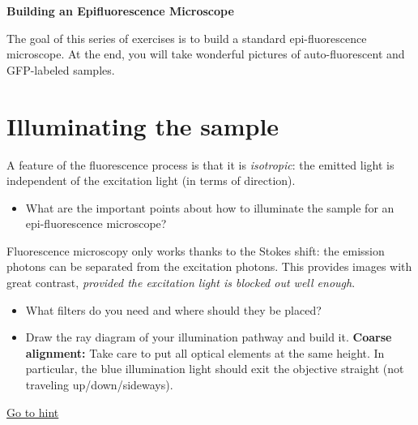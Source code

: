 \documentclass[a4paper]{report}
\begin{document}
\setcounter{secnumdepth}{2}
\begin{center}
	\textbf{\Large{Building an Epifluorescence Microscope}}
\end{center}

The goal of this series of exercises is to build a standard epi-fluorescence microscope. At the end, you will take wonderful pictures of auto-fluorescent and GFP-labeled samples.



\section{Illuminating the sample}
\hypertarget{hintBack-illumination}{}
A feature of the fluorescence process is that it is \emph{isotropic}: the emitted light is independent of the excitation light (in terms of direction).
\begin{itemize}
    \item What are the important points about how to illuminate the sample for an epi-fluorescence microscope?
   \end{itemize}
   Fluorescence microscopy only works thanks to the Stokes shift: the emission photons can be separated from the excitation photons. This provides images with great contrast, \emph{provided the excitation light is blocked out well enough}.
   \begin{itemize}
    \item What filters do you need and where should they be placed?
    \item Draw the ray diagram of your illumination pathway and build it. \textbf{Coarse alignment:} Take care to put all optical elements at the same height. In particular, the blue illumination light should exit the objective straight (not traveling up/down/sideways).
\end{itemize}
\hyperlink{hintTo-illumination}{Go to hint}


\end{document}
